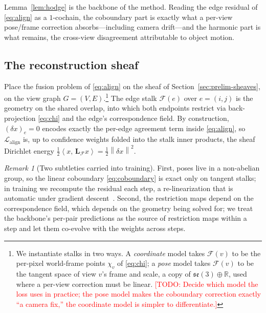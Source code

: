 \documentclass{article}
\newcommand{\R}{\mathbb{R}}
\newcommand{\norm}[1]{\left\lVert #1 \right\rVert}
\newcommand{\inner}[2]{\left\langle #1,\, #2 \right\rangle}
\newcommand{\sheaf}{\mathcal{F}}
\newcommand{\Lap}{\mathbf{L}}
\newcommand{\coboundary}{\delta}
\newcommand{\todo}[1]{\textcolor{red}{[TODO: #1]}}
\theoremstyle{definition}
\theoremstyle{plain}
\theoremstyle{remark}
\newtheorem{remark}{Remark}
\begin{document}
Lemma~\ref{lem:hodge} is the backbone of the method. Reading the edge
residual of \eqref{eq:align} as a $1$-cochain, the coboundary part is
exactly what a per-view pose/frame correction absorbs---including camera
drift---and the harmonic part is what remains, the cross-view
disagreement attributable to object motion.

\subsection{The reconstruction sheaf}
\label{sec:recon-sheaf}

Place the fusion problem of \eqref{eq:align} on the sheaf of
Section~\ref{sec:prelim-sheaves}, on the view graph
$G=(V,E)$.\footnote{We instantiate stalks in two ways. A
\emph{coordinate} model takes $\sheaf(v)$ to be the per-pixel world-frame
points $\chi_v$ of \eqref{eq:chi}; a \emph{pose} model takes $\sheaf(v)$
to be the tangent space of view $v$'s frame and scale, a copy of
$\mathfrak{se}(3)\oplus\R$, used where a per-view correction must be
linear. \todo{Decide which model the loss uses in practice; the pose
model makes the coboundary correction exactly ``a camera fix,'' the
coordinate model is simpler to differentiate.}}
The edge stalk $\sheaf(e)$ over $e=(i,j)$ is the geometry on the shared
overlap, into which both endpoints restrict via back-projection
\eqref{eq:chi} and the edge's correspondence field. By construction,
$(\coboundary x)_e=0$ encodes exactly the per-edge agreement term inside
\eqref{eq:align}, so $\mathcal{L}_{\mathrm{align}}$ is, up to confidence
weights folded into the stalk inner products, the sheaf Dirichlet energy
$\tfrac12\inner{x}{\Lap_{\sheaf}x}=\tfrac12\norm{\coboundary x}^2$.

\begin{remark}[Two subtleties carried into training]
\label{rem:subtleties}
First, poses live in a non-abelian group, so the linear coboundary
\eqref{eq:coboundary} is exact only on tangent stalks; in training we
recompute the residual each step, a re-linearization that is automatic
under gradient descent~\citep{singer2011angular,rosen2019se}. Second, the
restriction maps depend on the correspondence field, which depends on the
geometry being solved for; we treat the backbone's per-pair predictions as
the source of restriction maps within a step and let them co-evolve with
the weights across steps.
\end{remark}
\end{document}
